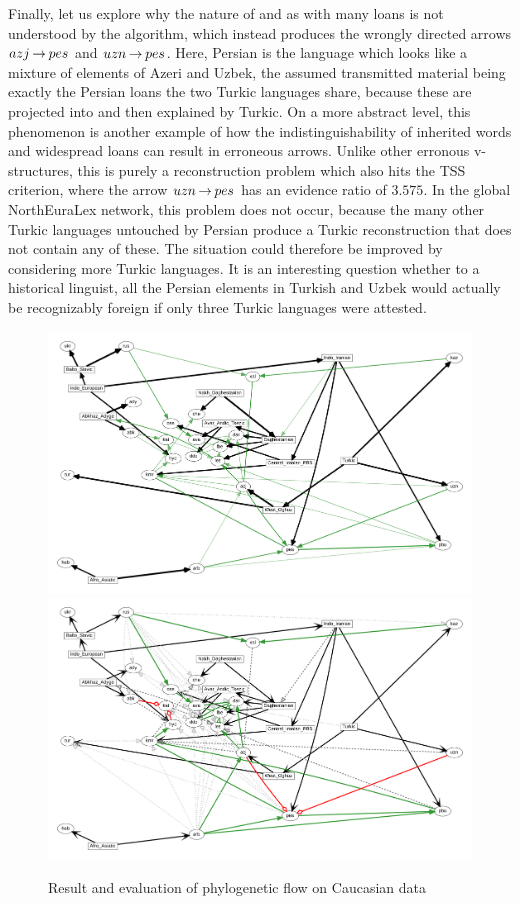 Finally, let us explore why the nature of  and  as  with many  loans is not understood by the algorithm, which instead produces the wrongly directed arrows $azj \kern 2pt\hbox{$\rightarrow$}\kern 2pt pes$ and $uzn \kern 2pt\hbox{$\rightarrow$}\kern 2pt pes$. Here, Persian is the language which looks like a mixture of elements of Azeri and Uzbek, the assumed transmitted material being exactly the Persian loans the two Turkic languages share, because these are projected into and then explained by Turkic. On a more abstract level, this phenomenon is another example of how the indistinguishability of inherited words and widespread loans can result in erroneous arrows. Unlike other erronous v-structures, this is purely a reconstruction problem which also hits the TSS criterion, where the arrow $uzn \kern 2pt\hbox{$\rightarrow$}\kern 2pt pes$ has an evidence ratio of $3.575$. In the global NorthEuraLex network, this problem does not occur, because the many other Turkic languages untouched by Persian produce a Turkic reconstruction that does not 
contain any of these. The situation could therefore be improved by considering more Turkic languages. It is an interesting question whether to a historical linguist, all the Persian elements in Turkish and Uzbek would actually be recognizably foreign if only three Turkic languages were attested.
 
  \begin{figure}[ht!]
 \includegraphics[width=\textwidth]{figures/caucasus-fs-ufr-ml-multi.pdf}
 \vspace*{5mm}
 \includegraphics[width=\textwidth]{figures/caucasus-fs-ufr-ml-multi-eval.pdf}
 \caption{Result and evaluation of phylogenetic flow on Caucasian data}
 \label{caucasus-result-phylo}
 \end{figure}

